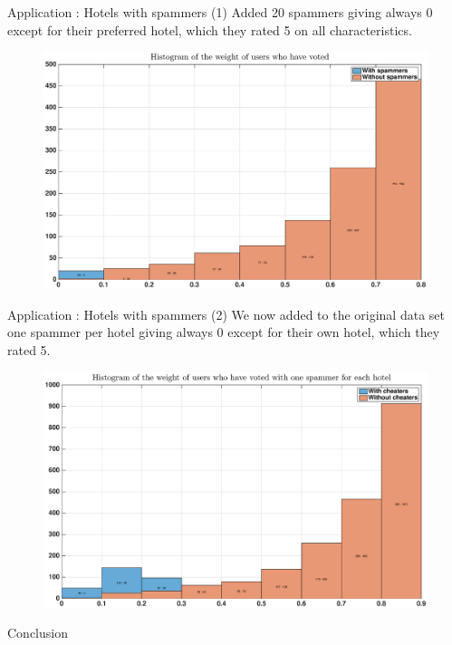 \begin{frame}{Application : Hotels with spammers (1)}
    Added 20 spammers giving always 0 except for their preferred hotel, which they rated 5 on all characteristics.
            \begin{figure}
            \centering
            \includegraphics[width=\textwidth]{../rapport/images/hotels/not_random_cheaters.eps}
        \end{figure}
\end{frame}

\begin{frame}{Application : Hotels with spammers (2)}
    We now added to the original data set one spammer per hotel giving always 0 except for their own hotel, which they rated 5.
            \begin{figure}
            \centering
            \includegraphics[width=\textwidth]{../rapport/images/hotels/not_random_each_hotels.eps}
        \end{figure}
\end{frame}

\usebackgroundtemplate{}
\begin{frame}{Conclusion}

\end{frame}